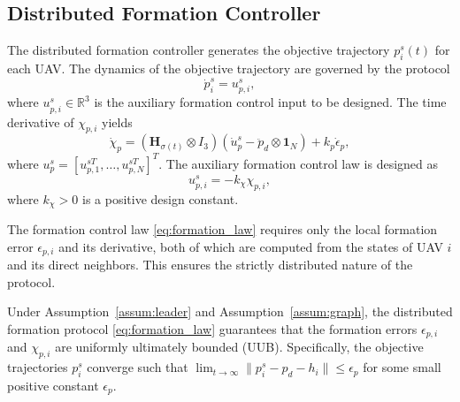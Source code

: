 \subsection{Distributed Formation Controller}
\label{sec5:formation_controller}

The distributed formation controller generates the objective trajectory
$p_i^s(t)$ for each UAV. The dynamics of the objective trajectory are governed
by the protocol
\begin{equation}
    \dot{p}_i^s = u_{p,i}^s,
    \label{eq:obj_traj_dyn}
\end{equation}
where $u_{p,i}^s \in \mathbb{R}^3$ is the auxiliary formation control input to
be designed. The time derivative of $\chi_{p,i}$ yields
\begin{equation}
    \dot{\chi}_p = \left(\mathbf{H}_{\sigma(t)} \otimes I_3\right)
    \left(\dot{u}_p^s - \ddot{p}_d \otimes \mathbf{1}_N\right)
    + k_p \dot{\epsilon}_p,
\end{equation}
where $u_p^s = [u_{p,1}^{sT}, \ldots, u_{p,N}^{sT}]^T$. The auxiliary formation
control law is designed as
\begin{equation}
    u_{p,i}^s = -k_\chi \chi_{p,i},
    \label{eq:formation_law}
\end{equation}
where $k_\chi > 0$ is a positive design constant.

\begin{remark}
The formation control law \eqref{eq:formation_law} requires only the local
formation error $\epsilon_{p,i}$ and its derivative, both of which are computed
from the states of UAV $i$ and its direct neighbors. This ensures the strictly
distributed nature of the protocol.
\end{remark}

\begin{theorem}
\label{thm:formation}
Under Assumption~\ref{assum:leader} and Assumption~\ref{assum:graph}, the
distributed formation protocol \eqref{eq:formation_law} guarantees that the
formation errors $\epsilon_{p,i}$ and $\chi_{p,i}$ are uniformly ultimately
bounded (UUB). Specifically, the objective trajectories $p_i^s$ converge such
that $\lim_{t \to \infty} \|p_i^s - p_d - h_i\| \leq \epsilon_p$ for some
small positive constant $\epsilon_p$.
\end{theorem}

